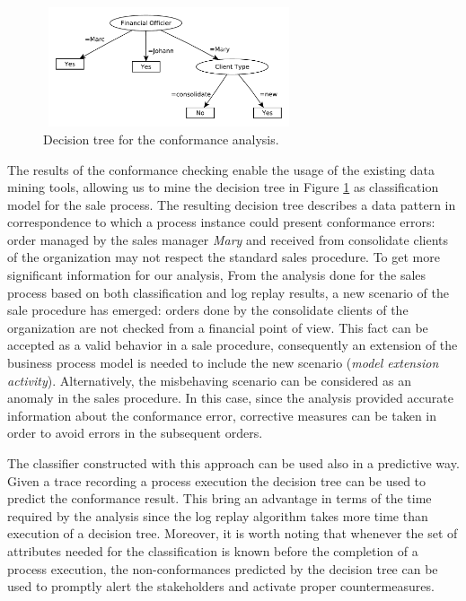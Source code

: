 \documentclass{llncs}
\begin{document}
\begin{figure}[h]
\centering
\includegraphics[width=210pt,height=100pt]
{./items/Sales_tree.pdf}
\caption{Decision tree for the conformance analysis.}
\label{salesDecTree}
\end{figure}

The results of the conformance checking enable the usage of the
existing data mining tools, allowing us to mine the decision tree in Figure \ref{salesDecTree} as classification model for the sale process.
The resulting decision tree describes a data pattern in correspondence to which a process instance could present conformance errors: order managed by the sales manager \emph{Mary} and received from consolidate clients of the organization may not respect the standard sales procedure. To get more significant information for our analysis, 
From the analysis done for the sales process based on both
classification and log replay results, a new scenario of the sale
procedure has emerged: orders done by the consolidate clients of the
organization are not checked from a financial point of view. This fact
can be accepted as a valid  behavior in a sale procedure, consequently
an extension of the business process model is needed to include the
new scenario (\emph{model extension activity}). Alternatively, the
misbehaving scenario can be considered as an anomaly in the sales
procedure. In this case, since the analysis provided accurate
information about the conformance error, corrective measures can be
taken in order to avoid errors in the subsequent orders.

The classifier constructed with this approach can be used also in a
predictive way. Given a trace recording a process execution the
decision tree can be used to predict the conformance result. This
bring an advantage in terms of the time required by the analysis since
the log replay algorithm takes more time than execution of a decision
tree. Moreover, it is worth noting that whenever the set of attributes
needed for the classification is known before the completion of a
process execution, the non-conformances predicted by the decision tree can
be used to promptly alert the stakeholders and activate proper
countermeasures. 
\end{document}
